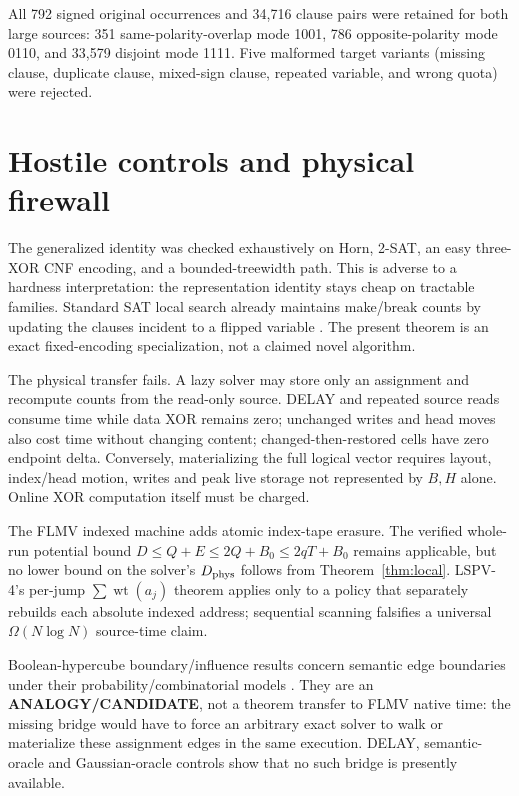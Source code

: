 \documentclass[11pt]{article}
\begin{document}
All 792 signed original occurrences and 34,716 clause pairs were retained for both large
sources: 351 same-polarity-overlap mode 1001, 786 opposite-polarity mode 0110, and 33,579
disjoint mode 1111.  Five malformed target variants (missing clause, duplicate clause,
mixed-sign clause, repeated variable, and wrong quota) were rejected.

\section{Hostile controls and physical firewall}
The generalized identity was checked exhaustively on Horn, 2-SAT, an easy three-XOR CNF
encoding, and a bounded-treewidth path.  This is adverse to a hardness interpretation:
the representation identity stays cheap on tractable families.  Standard SAT local
search already maintains make/break counts by updating the clauses incident to a flipped
variable \cite{Fukunaga,Pham}.  The present theorem is an exact fixed-encoding
specialization, not a claimed novel algorithm.

The physical transfer fails.  A lazy solver may store only an assignment and recompute
counts from the read-only source.  DELAY and repeated source reads consume time while
data XOR remains zero; unchanged writes and head moves also cost time without changing
content; changed-then-restored cells have zero endpoint delta.  Conversely, materializing
the full logical vector requires layout, index/head motion, writes and peak live storage
not represented by $B,H$ alone.  Online XOR computation itself must be charged.

The FLMV indexed machine adds atomic index-tape erasure.  The verified whole-run potential
bound $D\le Q+E\le2Q+B_0\le2qT+B_0$ remains applicable, but no lower bound on the
solver's $D_{\rm phys}$ follows from Theorem~\ref{thm:local}.  LSPV-4's per-jump
$\sum\operatorname{wt}(a_j)$ theorem applies only to a policy that separately rebuilds
each absolute indexed address; sequential scanning falsifies a universal
$\Omega(N\log N)$ source-time claim.

Boolean-hypercube boundary/influence results concern semantic edge boundaries under
their probability/combinatorial models \cite{EldanGross}.  They are an
\textbf{ANALOGY/CANDIDATE}, not a theorem transfer to FLMV native time: the missing bridge
would have to force an arbitrary exact solver to walk or materialize these assignment
edges in the same execution.  DELAY, semantic-oracle and Gaussian-oracle controls show
that no such bridge is presently available.
\end{document}
